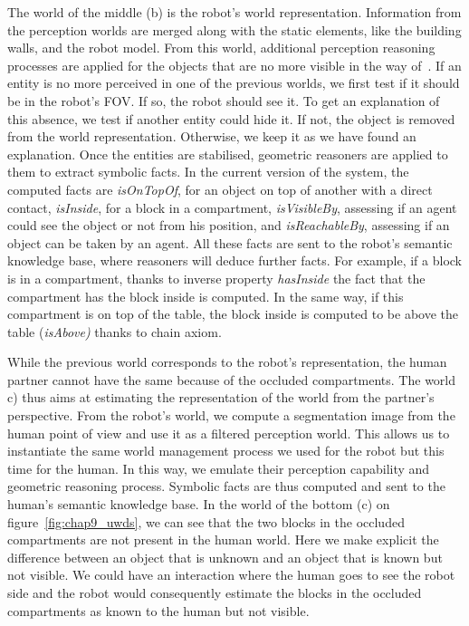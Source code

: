 The world of the middle (b) is the robot's world representation. Information from the perception worlds are merged along with the static elements, like the building walls, and the robot model. From this world, additional perception reasoning processes are applied for the objects that are no more visible in the way of~\cite{milliez_2014_framework}. If an entity is no more perceived in one of the previous worlds, we first test if it should be in the robot's FOV. If so, the robot should see it. To get an explanation of this absence, we test if another entity could hide it. If not, the object is removed from the world representation. Otherwise, we keep it as we have found an explanation.
Once the entities are stabilised, geometric reasoners are applied to them to extract symbolic facts. In the current version of the system, the computed facts are \textit{isOnTopOf}, for an object on top of another with a direct contact, \textit{isInside}, for a block in a compartment, \textit{isVisibleBy}, assessing if an agent could see the object or not from his position, and \textit{isReachableBy}, assessing if an object can be taken by an agent. All these facts are sent to the robot's semantic knowledge base, where reasoners will deduce further facts. For example, if a block is in a compartment, thanks to inverse property \textit{hasInside} the fact that the compartment has the block inside is computed. In the same way, if this compartment is on top of the table, the block inside is computed to be above the table (\textit{isAbove)} thanks to chain axiom.

While the previous world corresponds to the robot's representation, the human partner cannot have the same because of the occluded compartments. The world c) thus aims at estimating the representation of the world from the partner's perspective. From the robot's world, we compute a segmentation image from the human point of view and use it as a filtered perception world. This allows us to instantiate the same world management process we used for the robot but this time for the human. In this way, we emulate their perception capability and geometric reasoning process. Symbolic facts are thus computed and sent to the human's semantic knowledge base. In the world of the bottom (c) on figure~\ref{fig:chap9_uwds}, we can see that the two blocks in the occluded compartments are not present in the human world. Here we make explicit the difference between an object that is unknown and an object that is known but not visible. We could have an interaction where the human goes to see the robot side and the robot would consequently estimate the blocks in the occluded compartments as known to the human but not visible.

